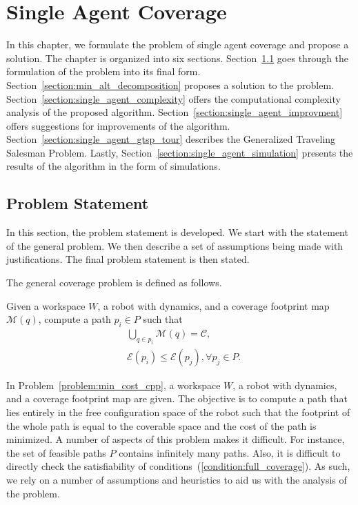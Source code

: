 \documentclass[../main.tex]{subfiles}
\begin{document}
\chapter{Single Agent Coverage}
\label{chapter:single_agent_coverage}

In this chapter, we formulate the problem of single agent coverage and propose a solution. The chapter is organized into six sections. Section~\ref{section:single_problem_statement} goes through the formulation of the problem into its final form. Section~\ref{section:min_alt_decomposition} proposes a solution to the problem. Section~\ref{section:single_agent_complexity} offers the computational complexity analysis of the proposed algorithm. Section~\ref{section:single_agent_improvment} offers suggestions for improvements of the algorithm. Section~\ref{section:single_agent_gtsp_tour} describes the Generalized Traveling Salesman Problem. Lastly, Section~\ref{section:single_agent_simulation} presents the results of the algorithm in the form of simulations.

\section{Problem Statement}
\label{section:single_problem_statement}

In this section, the problem statement is developed. We start with the statement of the general problem. We then describe a set of assumptions being made with justifications. The final problem statement is then stated.

The general coverage problem is defined as follows.
\begin{problem}
\label{problem:min_cost_cpp}
	Given a workspace $W$, a robot with dynamics, and a coverage footprint map $\mathcal{M}(q)$, compute a path $p_i\in P$ such that
	\begin{equation}
	\label{condition:full_coverage}
	\begin{aligned}
		& \bigcup_{q\in p_i}\mathcal{M}(q)=\mathcal{C},\\
		& \mathcal{E}(p_i)\leq\mathcal{E}(p_j), \forall p_j\in P.
	\end{aligned}
	\end{equation}
\end{problem}

In Problem~\ref{problem:min_cost_cpp}, a workspace $W$, a robot with dynamics, and a coverage footprint map are given. The objective is to compute a path that lies entirely in the free configuration space of the robot such that the footprint of the whole path is equal to the coverable space and the cost of the path is minimized. A number of aspects of this problem makes it difficult. For instance, the set of feasible paths $P$ contains infinitely many paths. Also, it is difficult to directly check the satisfiability of conditions~(\ref{condition:full_coverage}). As such, we rely on a number of assumptions and heuristics to aid us with the analysis of the problem.
\end{document}
